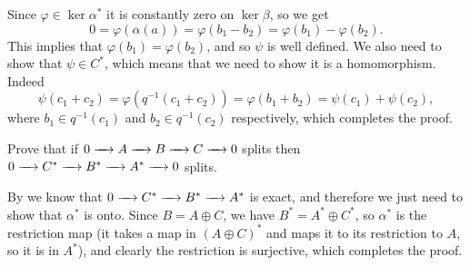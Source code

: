 \documentclass[11pt,a4paper]{article}
\begin{document}
\begin{solution}
\begin{description}
      Since $\varphi \in \ker \alpha^*$ it is constantly zero on $\ker \beta$,
      so we get
      \[
        0 =
        \varphi(\alpha(a)) =
        \varphi(b_1 - b_2) =
        \varphi(b_1) - \varphi(b_2).
      \]
      This implies that $\varphi(b_1) = \varphi(b_2)$,
      and so $\psi$ is well defined.
      We also need to show that $\psi \in C^*$,
      which means that we need to show it is a homomorphism.
      Indeed
      \[
        \psi(c_1 + c_2) =
        \varphi(q^{-1}(c_1 + c_2)) =
        \varphi(b_1 + b_2) =
        \psi(c_1) + \psi(c_2),
      \]
      where $b_1 \in q^{-1}(c_1)$ and $b_2 \in q^{-1}(c_2)$
      respectively, which completes the proof.
  \end{description}
\end{solution}

\begin{exercise}
  Prove that if
  $0 \xrightarrow{\quad} A \xrightarrow{\quad} B \xrightarrow{\quad} C \xrightarrow{\quad} 0$
  splits then
  $0 \xrightarrow{\quad} C^* \xrightarrow{\quad} B^* \xrightarrow{\quad} A^* \xrightarrow{\quad} 0$
  splits.
\end{exercise}
\begin{solution}
  By  we know that
  $0 \xrightarrow{\quad} C^* \xrightarrow{\quad} B^* \xrightarrow{\quad} A^*$ is exact,
  and therefore we just need to show that $\alpha^*$ is onto.
  Since $B = A \oplus C$, we have $B^* = A^* \oplus C^*$,
  so $\alpha^*$ is the restriction map
  (it takes a map in $(A \oplus C)^*$ and maps it to its restriction
  to $A$, so it is in $A^*$), and clearly the restriction is surjective,
  which completes the proof.
\end{solution}
\end{document}
